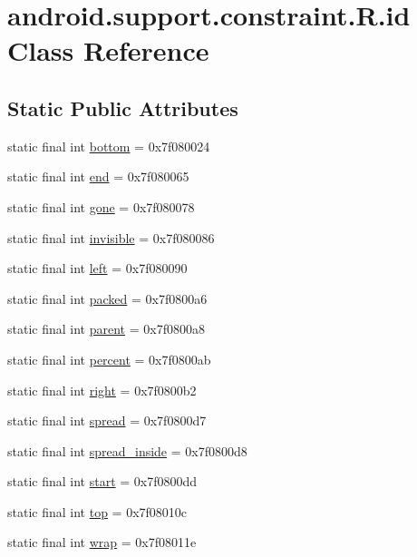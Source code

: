\hypertarget{classandroid_1_1support_1_1constraint_1_1_r_1_1id}{}\section{android.\+support.\+constraint.\+R.\+id Class Reference}
\label{classandroid_1_1support_1_1constraint_1_1_r_1_1id}
\subsection*{Static Public Attributes}
\begin{DoxyCompactItemize}
\item 
static final int \mbox{\hyperlink{classandroid_1_1support_1_1constraint_1_1_r_1_1id_aac6970b85d00403c4068ba6add94397e}{bottom}} = 0x7f080024
\item 
static final int \mbox{\hyperlink{classandroid_1_1support_1_1constraint_1_1_r_1_1id_a9adc6d511b4404ea9e87c30c0a8b29d5}{end}} = 0x7f080065
\item 
static final int \mbox{\hyperlink{classandroid_1_1support_1_1constraint_1_1_r_1_1id_ad1a680f7fa70080653d47e765b94ba4a}{gone}} = 0x7f080078
\item 
static final int \mbox{\hyperlink{classandroid_1_1support_1_1constraint_1_1_r_1_1id_a4a86e03a08094000bce9ab656c463eb8}{invisible}} = 0x7f080086
\item 
static final int \mbox{\hyperlink{classandroid_1_1support_1_1constraint_1_1_r_1_1id_a2bed15fd0ff924a74b1f55a838780ab4}{left}} = 0x7f080090
\item 
static final int \mbox{\hyperlink{classandroid_1_1support_1_1constraint_1_1_r_1_1id_a6f318bd8cf4a4a7b6bb91ae39aafc8c6}{packed}} = 0x7f0800a6
\item 
static final int \mbox{\hyperlink{classandroid_1_1support_1_1constraint_1_1_r_1_1id_ad1010c30c224329a8e25e8b2721b73ff}{parent}} = 0x7f0800a8
\item 
static final int \mbox{\hyperlink{classandroid_1_1support_1_1constraint_1_1_r_1_1id_a08be8e4ddff0f0dabcfc093e3d88dd73}{percent}} = 0x7f0800ab
\item 
static final int \mbox{\hyperlink{classandroid_1_1support_1_1constraint_1_1_r_1_1id_adc461c6efc15f4b4c9ccd96dcb0e8813}{right}} = 0x7f0800b2
\item 
static final int \mbox{\hyperlink{classandroid_1_1support_1_1constraint_1_1_r_1_1id_a19ff6e1cce6df7438948c99f48d6a96c}{spread}} = 0x7f0800d7
\item 
static final int \mbox{\hyperlink{classandroid_1_1support_1_1constraint_1_1_r_1_1id_abe08ca72966af7af713a9537e4a0ff48}{spread\+\_\+inside}} = 0x7f0800d8
\item 
static final int \mbox{\hyperlink{classandroid_1_1support_1_1constraint_1_1_r_1_1id_a91e6ac0dae1fd6486cac306d07e888e2}{start}} = 0x7f0800dd
\item 
static final int \mbox{\hyperlink{classandroid_1_1support_1_1constraint_1_1_r_1_1id_a2587884e7669658143444a31735a1530}{top}} = 0x7f08010c
\item 
static final int \mbox{\hyperlink{classandroid_1_1support_1_1constraint_1_1_r_1_1id_ae0562e247c624b01fdf91a6e003f141d}{wrap}} = 0x7f08011e
\end{DoxyCompactItemize}
